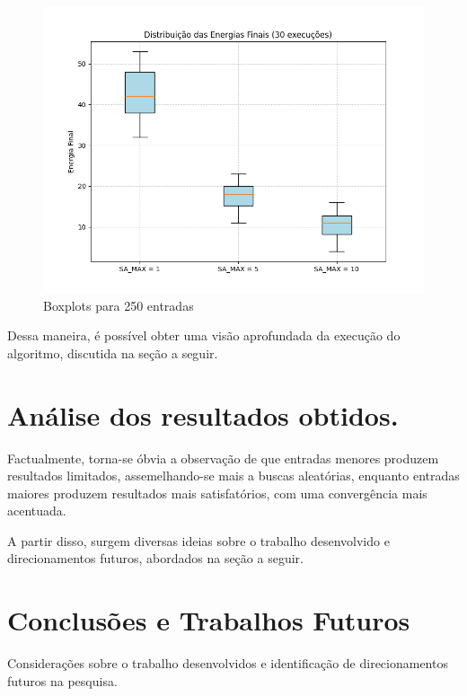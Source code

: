 \documentclass[12pt]{article}
\begin{document}
\begin{figure}[H]
  \centering
  \includegraphics[width=.9\textwidth]{../../boxplot_250.png}
  \caption{Boxplots para 250 entradas}
  \label{fig:metodologia}
  \end{figure}

Dessa maneira, é possível obter uma visão aprofundada da execução do algoritmo, discutida na seção a seguir.

\section{Análise dos resultados obtidos.}
\label{sec:analise_dos_resultados_obtidos}

Factualmente, torna-se óbvia a observação de que entradas menores produzem resultados limitados, assemelhando-se mais a buscas aleatórias, enquanto entradas maiores produzem resultados mais satisfatórios, com uma convergência mais acentuada.


A partir disso, surgem diversas ideias sobre o trabalho desenvolvido e direcionamentos futuros, abordados na seção a seguir.

\section{Conclusões e Trabalhos Futuros}
\label{sec:conclusoes_e_trabalhos_futuros}


Considerações sobre o trabalho desenvolvidos e identificação de direcionamentos futuros na
pesquisa.





\end{document}
